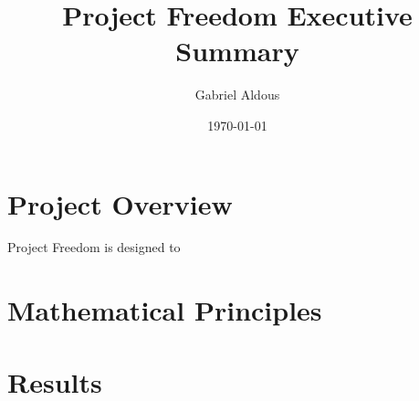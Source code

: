 \documentclass[notitlepage]{article}
\begin{document}

\title{Project Freedom Executive Summary}
\author{Gabriel Aldous}
\date{\isodate\today}

\maketitle

\tableofcontents

\newpage
\section{Project Overview}

Project Freedom is designed to 

\section{Mathematical Principles}

\section{Results}
\end{document}
